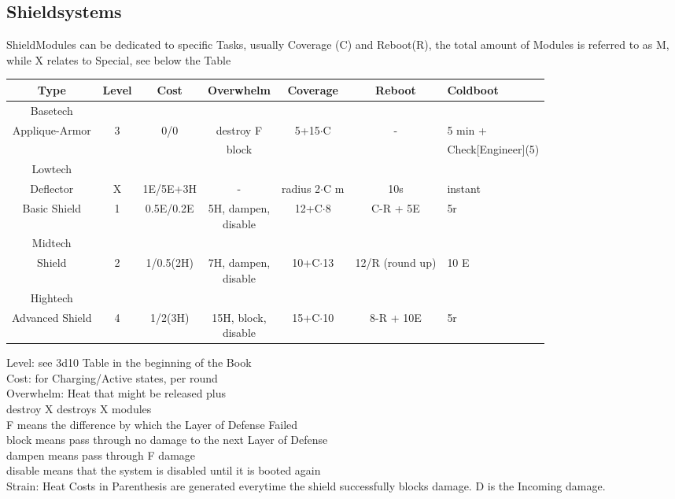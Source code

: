 \documentclass{article}
\newcommand\tab[1][1cm]{\hspace*{#1}}
\begin{document}
    \subsection{Shieldsystems}
    ShieldModules can be dedicated to specific Tasks, usually
    Coverage (C) and Reboot(R), the total amount of Modules is referred to as M, while
    X relates to Special, see below the Table\newline
    \begin{tabular}{c|cccccl}
        Type & Level & Cost & Overwhelm & Coverage & Reboot & Coldboot \\
        \hline Basetech\\
        Applique-Armor & 3 & 0/0 & destroy F& 5+15\(\cdot\)C & -  & 5 min + \\
        &&&block&&& Check[Engineer](5) \\
        \hline Lowtech\\
        Deflector & X & 1E/5E+3H & - & radius 2\(\cdot\)C m & 10s & instant \\
        Basic Shield & 1 & 0.5E/0.2E & \makecell{5H, dampen, \\disable}&12+C\(\cdot\)8 & C-R + 5E & 5r \\
        \hline Midtech\\
        Shield & 2 & 1/0.5(2H) & \makecell{7H, dampen,\\disable} & 10+C\(\cdot\)13 & 12/R (round up) & 10 E \\
        \hline Hightech\\
        Advanced Shield & 4 & 1/2(3H) & \makecell{15H, block,\\disable}& 15+C\(\cdot\)10 & 8-R + 10E & 5r \\
    \end{tabular}\newline\newline\newline
    Level: see 3d10 Table in the beginning of the Book\\
    Cost: for Charging/Active states, per round\\
    Overwhelm: Heat that might be released plus \\
    \tab destroy X destroys X modules\\
    \tab F means the difference by which the Layer of Defense Failed\\
    \tab block means pass through no damage to the next Layer of Defense\\
    \tab dampen means pass through F damage\\
    \tab disable means that the system is disabled until it is booted again\\
    \newline
    Strain: Heat Costs in Parenthesis are generated everytime the shield successfully blocks damage. D is the Incoming damage.
    \pagebreak[2]
\end{document}
